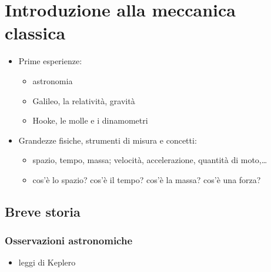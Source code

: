 \documentclass[letterpaper,10pt,italian]{jupyterBook}
\begin{document}
\sphinxstepscope


\chapter{Introduzione alla meccanica classica}
\label{\detokenize{ch/mechanics/intro:introduzione-alla-meccanica-classica}}\label{\detokenize{ch/mechanics/intro:physics-hs-mechanics-intro}}\label{\detokenize{ch/mechanics/intro::doc}}\begin{itemize}
\item {} 
\sphinxAtStartPar
Prime esperienze:
\begin{itemize}
\item {} 
\sphinxAtStartPar
astronomia

\item {} 
\sphinxAtStartPar
Galileo, la relatività, gravità

\item {} 
\sphinxAtStartPar
Hooke, le molle e i dinamometri

\end{itemize}

\item {} 
\sphinxAtStartPar
Grandezze fisiche, strumenti di misura e concetti:
\begin{itemize}
\item {} 
\sphinxAtStartPar
spazio, tempo, massa; velocità, accelerazione, quantità di moto,…

\item {} 
\sphinxAtStartPar
cos’è lo spazio? cos’è il tempo? cos’è la massa? cos’è una forza?

\end{itemize}

\end{itemize}


\section{Breve storia}
\label{\detokenize{ch/mechanics/intro:breve-storia}}

\subsection{Osservazioni astronomiche}
\label{\detokenize{ch/mechanics/intro:osservazioni-astronomiche}}\begin{itemize}
\item {} 
\sphinxAtStartPar
leggi di Keplero

\end{itemize}
\end{document}
